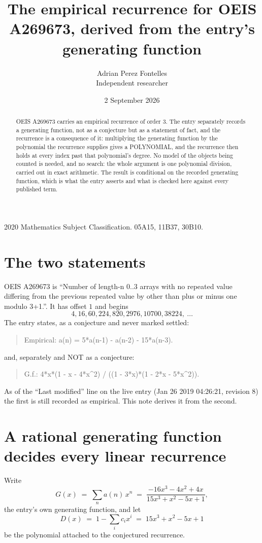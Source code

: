 \documentclass[11pt,a4paper]{article}
\title{The empirical recurrence for OEIS A269673, derived from the entry's generating function}
\author{Adrian Perez Fontelles\\ \small Independent researcher}
\date{2 September 2026}
\theoremstyle{plain}
\theoremstyle{definition}
\begin{document}
\maketitle

\begin{abstract}
OEIS A269673 carries an empirical recurrence of order $3$. The entry separately records a
generating function, not as a conjecture but as a statement of fact, and the recurrence is a
consequence of it: multiplying the generating function by the polynomial the recurrence
supplies gives a POLYNOMIAL, and the recurrence then holds at every index past that
polynomial's degree. No model of the objects being counted is needed, and no search: the
whole argument is one polynomial division, carried out in exact arithmetic. The result is
conditional on the recorded generating function, which is what the entry asserts and what is
checked here against every published term.
\end{abstract}

\noindent\small 2020 Mathematics Subject Classification. 05A15, 11B37, 30B10.\normalsize

\section{The two statements}

OEIS A269673 is ``Number of length-n 0..3 arrays with no repeated value differing from the previous repeated value by other than plus or minus one modulo 3+1.''. It has offset $1$ and begins
\[
4, 16, 60, 224, 820, 2976, 10700, 38224,\ \dots
\]
The entry states, as a conjecture and never marked settled:
\begin{quote}
Empirical: a(n) = 5*a(n-1) - a(n-2) - 15*a(n-3).
\end{quote}
and, separately and NOT as a conjecture:
\begin{quote}
G.f.: 4*x*(1 - x - 4*x\^{}2) / ((1 - 3*x)*(1 - 2*x - 5*x\^{}2)).
\end{quote}
As of the ``Last modified'' line on the live entry (Jan 26 2019 04:26:21, revision 8) the first is still
recorded as empirical. This note derives it from the second.

\section{A rational generating function decides every linear recurrence}

Write
\[
G(x)\;=\;\sum_{n}a(n)\,x^{n}\;=\;\frac{- 16 x^{3} - 4 x^{2} + 4 x}{15 x^{3} + x^{2} - 5 x + 1},
\]
the entry's own generating function, and let
\[
D(x)\;=\;1-\sum_i c_i x^{i}\;=\;15 x^{3} + x^{2} - 5 x + 1
\]
be the polynomial attached to the conjectured recurrence.
\end{document}
